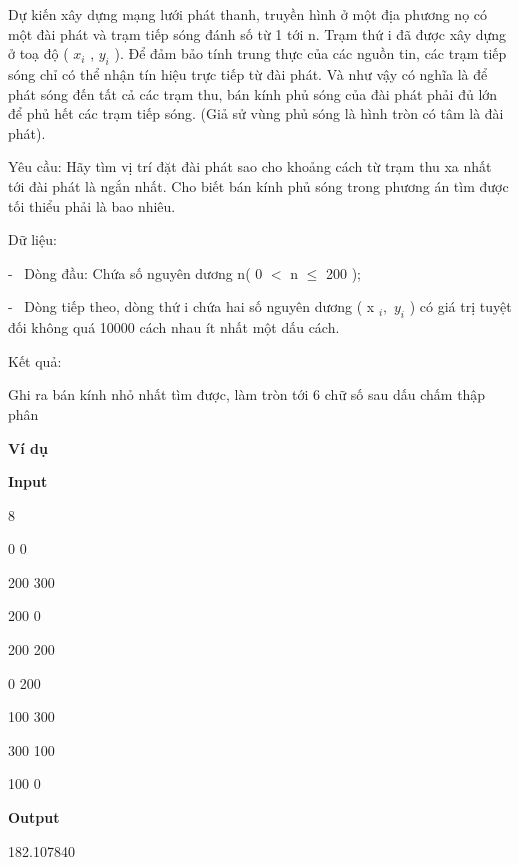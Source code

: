 

Dự kiến xây dựng mạng lưới phát thanh, truyền hình ở một địa phương nọ có một đài phát và trạm tiếp sóng đánh số từ 1 tới n. Trạm thứ i đã được xây dựng ở toạ độ ( $x_{i}$ , $y_{i}$ ). Để đảm bảo tính trung thực của các nguồn tin, các trạm tiếp sóng chỉ có thể nhận tín hiệu trực tiếp từ đài phát. Và như vậy có nghĩa là để phát sóng đến tất cả các trạm thu, bán kính phủ sóng của đài phát phải đủ lớn để phủ hết các trạm tiếp sóng. (Giả sử vùng phủ sóng là hình tròn có tâm là đài phát).




Yêu cầu: Hãy tìm vị trí đặt đài phát sao cho khoảng cách từ trạm thu xa nhất tới đài phát là ngắn nhất. Cho biết bán kính phủ sóng trong phương án tìm được tối thiểu phải là bao nhiêu.




Dữ liệu:


-  Dòng đầu: Chứa số nguyên dương n( 0 $<$ n  $\le$  200 );


-  Dòng tiếp theo, dòng thứ i chứa hai số nguyên dương ( x $_ i , $ $y_{i}$ ) có giá trị tuyệt đối không quá 10000 cách nhau ít nhất một dấu cách.




Kết quả:


Ghi ra bán kính nhỏ nhất tìm được, làm tròn tới 6 chữ số sau dấu chấm thập phân

\textbf{Ví dụ }




\textbf{Input}


8


0 0


200 300


200 0


200 200


0 200


100 300


300 100


100 0\textbf{}

\textbf{Output}


182.107840
